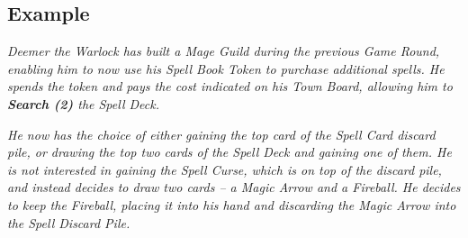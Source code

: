 \begin{multicols*}{2}
\subsection*{Example}

\textit{Deemer the Warlock has built a Mage Guild during the previous Game Round, enabling him to now use his Spell Book Token to purchase additional spells.
He spends the token and pays the cost indicated on his Town Board, allowing him to \textbf{Search (2)} the Spell Deck.}\par
\textit{He now has the choice of either gaining the top card of the Spell Card discard pile, or drawing the top two cards of the Spell Deck and gaining one of them.
He is not interested in gaining the Spell Curse, which is on top of the discard pile, and instead decides to draw  two cards – a Magic Arrow and a Fireball.
He decides to keep the Fireball, placing it into his hand and discarding the Magic Arrow into the Spell Discard Pile.}

\end{multicols*}
